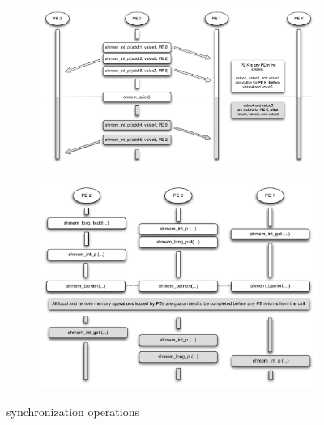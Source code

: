 \begin{figure}
        \begin{subfigure}{0.48\textwidth}
                \includegraphics[width=\textwidth]{diagrams/updated/quiet}
                \caption{}
                \label{fig:quiet}
        \end{subfigure}
	\begin{subfigure}{0.48\textwidth}
		\includegraphics[width=\textwidth]{diagrams/updated/barrier}
		\caption{}
		\label{fig:barrier}
	\end{subfigure}
        \caption{\OSH{} synchronization operations}\label{fig:animals}
\end{figure}
